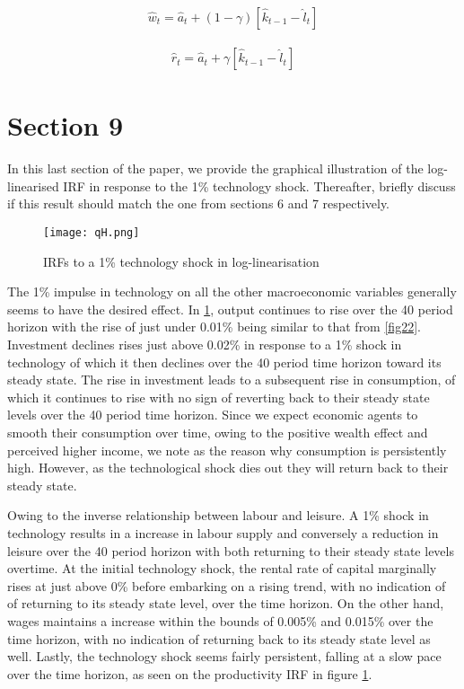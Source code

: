 \documentclass[
  11pt,
  justified]{article}
\begin{document}
\begin{align}
\hat w_t = \hat a_t + (1- \gamma)[\hat k_{t-1} - \hat l_t] \tag{Wage}
\label{eq:wage2}
\end{align}

\begin{align}
\hat r_t = \hat a_t + \gamma[\hat k_{t-1} - \hat l_t] \tag{Capital return}
\label{eq:capital_return2}
\end{align}

\hypertarget{section-9}{%
\section{Section 9}\label{section-9}}

In this last section of the paper, we provide the graphical illustration
of the log-linearised IRF in response to the 1\% technology shock.
Thereafter, briefly discuss if this result should match the one from
sections 6 and 7 respectively.

\begin{figure}
    \texttt{[image: qH.png]}
    \caption{IRFs to a 1\% technology shock in log-linearisation}
    \label{fig3}
\end{figure}

The 1\% impulse in technology on all the other macroeconomic variables
generally seems to have the desired effect. In \ref{fig3}, output
continues to rise over the 40 period horizon with the rise of just under
0.01\% being similar to that from \ref{fig22}. Investment declines rises
just above 0.02\% in response to a 1\% shock in technology of which it
then declines over the 40 period time horizon toward its steady state.
The rise in investment leads to a subsequent rise in consumption, of
which it continues to rise with no sign of reverting back to their
steady state levels over the 40 period time horizon. Since we expect
economic agents to smooth their consumption over time, owing to the
positive wealth effect and perceived higher income, we note as the
reason why consumption is persistently high. However, as the
technological shock dies out they will return back to their steady
state.

Owing to the inverse relationship between labour and leisure. A 1\%
shock in technology results in a increase in labour supply and
conversely a reduction in leisure over the 40 period horizon with both
returning to their steady state levels overtime. At the initial
technology shock, the rental rate of capital marginally rises at just
above 0\% before embarking on a rising trend, with no indication of of
returning to its steady state level, over the time horizon. On the other
hand, wages maintains a increase within the bounds of 0.005\% and
0.015\% over the time horizon, with no indication of returning back to
its steady state level as well. Lastly, the technology shock seems
fairly persistent, falling at a slow pace over the time horizon, as seen
on the productivity IRF in figure \ref{fig3}.
\end{document}

